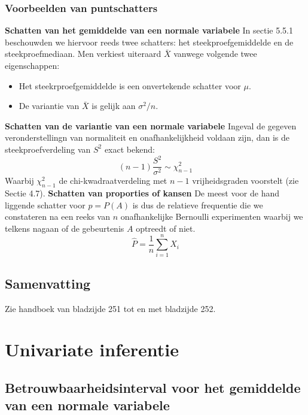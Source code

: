 \documentclass[titlepage]{article}
\numberwithin{equation}{section}
\begin{document}
\subsubsection{Voorbeelden van puntschatters}
\textbf{Schatten van het gemiddelde van een normale variabele}\newline\newline
In sectie 5.5.1 beschouwden we hiervoor reeds twee schatters: het steekproefgemiddelde en de steekproefmediaan. Men verkiest uiteraard $\bar{X}$ vanwege volgende twee eigenschappen:
\begin{itemize}
	\item Het steekrproefgemiddelde is een onvertekende schatter voor $\mu$.
	\item De variantie van $\bar{X}$ is gelijk aan $\sigma^2/n$.
\end{itemize}
\textbf{Schatten van de variantie van een normale variabele}\newline\newline
Ingeval de gegeven veronderstellingn van normaliteit en onafhankelijkheid voldaan zijn, dan is de steekproefverdeling van $S^2$ exact bekend:
\begin{equation}
	(n-1) \frac{S^2}{\sigma^2} \sim \chi^2_{n-1}
	\label{5.16}
\end{equation}
Waarbij $\chi^2_{n-1}$ de chi-kwadraatverdeling met $n-1$ vrijheidsgraden voorstelt (zie Sectie 4.7).\newline\newline
\textbf{Schatten van proporties of kansen}\newline\newline
De meest voor de hand liggende schatter voor $p=P(A)$ is dus de relatieve frequentie die we constateren na een reeks van $n$ onafhankelijke Bernoulli experimenten waarbij we telkens nagaan of de gebeurtenis $A$ optreedt of niet.
\begin{equation*}
	\hat{P}=\frac{1}{n}\sum\limits_{i=1}^n X_i
\end{equation*}
\subsection{Samenvatting}
Zie handboek van bladzijde 251 tot en met bladzijde 252.
\section{Univariate inferentie}
\subsection{Betrouwbaarheidsinterval voor het gemiddelde van een normale variabele}
\end{document}
